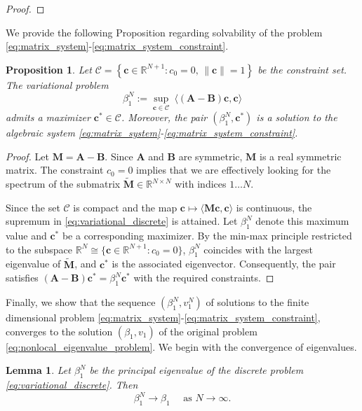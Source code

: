 \documentclass[12pt, a4paper]{article}
\theoremstyle{break}
\theoremstyle{break}
\newtheorem{prp}{Proposition}[section]
\theoremstyle{break}
\theoremstyle{break}
\theoremstyle{break}
\newtheorem{lem}{Lemma}[section]
\theoremstyle{break}
\theoremstyle{break}
\theoremstyle{break}
\theoremstyle{break}
\begin{document}
\begin{proof}
\end{proof}

We provide the following Proposition regarding solvability of the problem \eqref{eq:matrix_system}-\eqref{eq:matrix_system_constraint}.
\begin{prp}
    \label{prp:finite_dimensional_minimizer}
    Let $\mathcal{C} = \left\{ \mathbf{c} \in \mathbb{R}^{N+1} : c_0 = 0, \, \|\mathbf{c}\| = 1 \right\}$ be the constraint set. 
    The variational problem
    \begin{equation}
        \label{eq:variational_discrete}
        \beta_1^N := \sup_{\mathbf{c} \in \mathcal{C}} \: \langle (\mathbf{A} - \mathbf{B}) \mathbf{c}, \mathbf{c} \rangle
    \end{equation}
    admits a maximizer $\mathbf{c}^* \in \mathcal{C}$. Moreover, the pair $(\beta_1^N, \mathbf{c}^*)$ is a solution to the algebraic system \eqref{eq:matrix_system}-\eqref{eq:matrix_system_constraint}.
\end{prp}

\begin{proof}
    Let $\mathbf{M} = \mathbf{A} - \mathbf{B}$. Since $\mathbf{A}$ and $\mathbf{B}$ are symmetric, $\mathbf{M}$ is a real symmetric matrix. The constraint $c_0=0$ implies that we are effectively looking for the spectrum of the submatrix $\tilde{\mathbf{M}} \in \mathbb{R}^{N \times N}$ with indices $1 \dots N$.
    
    Since the set $\mathcal{C}$ is compact and the map $\mathbf{c} \mapsto \langle \mathbf{M}\mathbf{c}, \mathbf{c}\rangle$ is continuous, the supremum in \eqref{eq:variational_discrete} is attained. Let $\beta_1^N$ denote this maximum value and $\mathbf{c}^*$ be a corresponding maximizer. By the min-max principle restricted to the subspace $\mathbb{R}^N \cong \{ \mathbf{c} \in \mathbb{R}^{N+1} : c_0=0 \}$, $\beta_1^N$ coincides with the largest eigenvalue of $\tilde{\mathbf{M}}$, and $\mathbf{c}^*$ is the associated eigenvector. Consequently, the pair satisfies $(\mathbf{A}-\mathbf{B})\mathbf{c}^* = \beta_1^N \mathbf{c}^*$ with the required constraints.
\end{proof}

Finally, we show that the sequence $(\beta_1^N, v_1^N)$ of solutions to the finite dimensional problem \eqref{eq:matrix_system}-\eqref{eq:matrix_system_constraint}, converges to the solution $(\beta_1, v_1)$ of the original problem \eqref{eq:nonlocal_eigenvalue_problem}. We begin with the convergence of eigenvalues.

\begin{lem}
    \label{lem:convergence_principal_eigenvalue}
    Let $\beta_1^N$ be the principal eigenvalue of the discrete problem \eqref{eq:variational_discrete}. Then
    \begin{equation*}
        \beta_1^N \rightarrow \beta_1 \quad \text{ as } N \rightarrow \infty.
    \end{equation*}
\end{lem}
\end{document}
